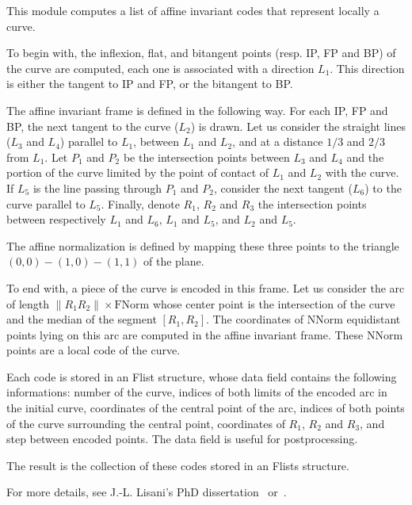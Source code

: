 This module computes a list of affine invariant codes that represent locally a curve.

To begin with, the inflexion, flat, and bitangent points (resp. IP, FP and BP) of the curve are computed, each one is associated with a direction $L_1$. This direction is either the tangent to IP and FP, or the bitangent to BP.

The affine invariant frame is defined in the following way. For each IP, FP and BP, the next tangent to the curve ($L_2$) is drawn. Let us consider the straight lines ($L_3$ and $L_4$) parallel to $L_1$, between $L_1$ and $L_2$, and at a distance $1/3$ and $2/3$ from $L_1$. Let $P_1$ and $P_2$ be the intersection points between $L_3$ and $L_4$ and the portion of the curve limited by the point of contact of $L_1$ and $L_2$ with the curve. If $L_5$ is the line passing through $P_1$ and $P_2$, consider the next tangent ($L_6$) to the curve parallel to $L_5$. Finally, denote $R_1$, $R_2$ and $R_3$ the intersection points between respectively $L_1$ and $L_6$, $L_1$ and $L_5$, and $L_2$ and $L_5$.

The affine normalization is defined by mapping these three points to the triangle $(0,0)-(1,0)-(1,1)$ of the plane.

To end with, a piece of the curve is encoded in this frame. Let us consider the arc of length $\| R_1R_2 \| \times \mbox{FNorm}$ whose center point is the intersection of the curve and the median of the segment $[R_1,R_2]$. The coordinates of $\mbox{NNorm}$ equidistant points lying on this arc are computed in the affine invariant frame. These $\mbox{NNorm}$ points are a local code of the curve.

\medskip

Each code is stored in an Flist structure, whose data field contains the following informations: number of the curve, indices of both limits of the encoded arc in the initial curve, coordinates of the central point of the arc, indices of both points of the curve surrounding the central point, coordinates of $R_1$, $R_2$ and $R_3$, and step between encoded points. The data field is useful for postprocessing.

The result is the collection of these codes stored in an Flists structure.

\medskip

For more details, see J.-L. Lisani's PhD dissertation~\cite{lisani:comparaison} 
or~\cite{lisani.monasse.ea:on}.
